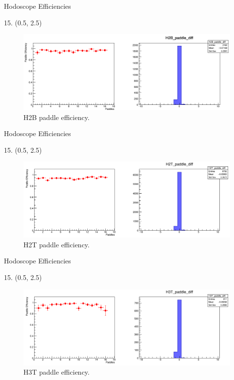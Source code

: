 \documentclass[12pt, xcolor={dvipsnames}, aspectratio = 169, sans,mathserif]{beamer}
\newenvironment{Pic}[2]
{
\begin{textblock}{#1} #2
\begin{figure}
}
{
\end{figure}
\end{textblock}
}
\begin{document}
\begin{frame}{Hodoscope Efficiencies}
\begin{Pic}{15.}{(0.5, 2.5)}
  \includegraphics[width=15.0cm]{imgs/H2B_paddle_diff.png}
  \caption{H2B paddle efficiency.}
\end{Pic}
\end{frame}

\begin{frame}{Hodoscope Efficiencies}
\begin{Pic}{15.}{(0.5, 2.5)}
  \includegraphics[width=15.0cm]{imgs/H2T_paddle_diff.png}
  \caption{H2T paddle efficiency.}
\end{Pic}
\end{frame}

\begin{frame}{Hodoscope Efficiencies}
\begin{Pic}{15.}{(0.5, 2.5)}
  \includegraphics[width=15.0cm]{imgs/H3T_paddle_diff.png}
  \caption{H3T paddle efficiency.}
\end{Pic}
\end{frame}
\end{document}
